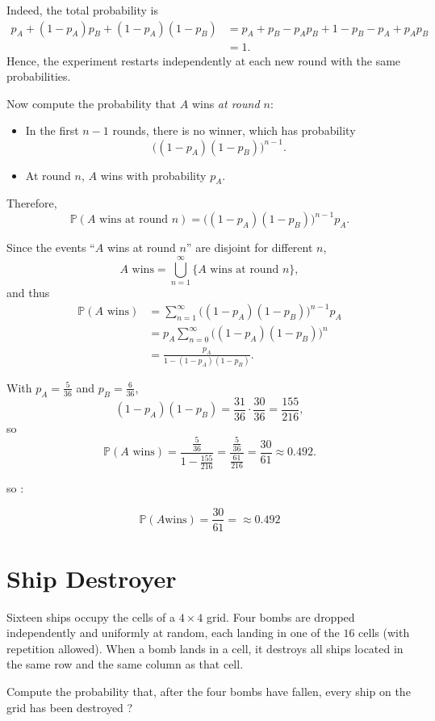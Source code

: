 Indeed, the total probability is
\begin{align*}
p_A + (1-p_A)p_B + (1-p_A)(1-p_B)
&= p_A + p_B - p_Ap_B + 1 - p_B - p_A + p_Ap_B \\
&= 1.
\end{align*}
Hence, the experiment restarts independently at each new round with the same probabilities.

\medskip
Now compute the probability that $A$ wins \emph{at round $n$}:
\begin{itemize}
  \item In the first $n-1$ rounds, there is no winner, which has probability
  \[
    \bigl((1-p_A)(1-p_B)\bigr)^{n-1}.
  \]
  \item At round $n$, $A$ wins with probability $p_A$.
\end{itemize}
Therefore,
\[
\mathbb{P}(A\text{ wins at round }n)
=
\bigl((1-p_A)(1-p_B)\bigr)^{n-1}p_A.
\]

Since the events ``$A$ wins at round $n$'' are disjoint for different $n$,
\[
A\text{ wins}
=
\bigcup_{n=1}^{\infty}\{A\text{ wins at round }n\},
\]
and thus
\begin{align*}
\mathbb{P}(A\text{ wins})
&= \sum_{n=1}^{\infty} \bigl((1-p_A)(1-p_B)\bigr)^{n-1}p_A \\
&= p_A \sum_{n=0}^{\infty} \bigl((1-p_A)(1-p_B)\bigr)^{n} \\
&= \frac{p_A}{1-(1-p_A)(1-p_B)}.
\end{align*}

With $p_A=\frac{5}{36}$ and $p_B=\frac{6}{36}$,
\[
(1-p_A)(1-p_B)=\frac{31}{36}\cdot\frac{30}{36}=\frac{155}{216},
\]
so
\[
\mathbb{P}(A\text{ wins})
=
\frac{\frac{5}{36}}{1-\frac{155}{216}}
=
\frac{\frac{5}{36}}{\frac{61}{216}}
=
\frac{30}{61}
\approx 0.492.
\]

so :

\[
\boxed{
\mathbb{P}(A \text{wins}) = \frac{30}{61} = \approx 0.492
}
\]



\section{Ship Destroyer}




\begin{exerciseBox} 
Sixteen ships occupy the cells of a $4 \times 4$ grid. Four bombs are dropped independently and uniformly at random, each landing in one of the $16$ cells (with repetition allowed).
When a bomb lands in a cell, it destroys all ships located in the same row and the same column as that cell.

  
Compute the probability that, after the four bombs have fallen, every ship on the grid has been destroyed ?
\end{exerciseBox}  


